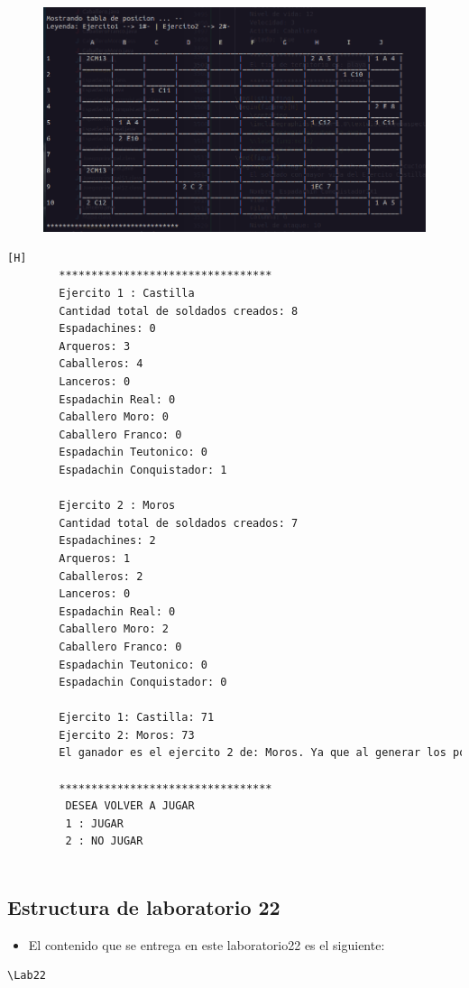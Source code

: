 \documentclass{article}
\begin{document}
	\begin{figure}[H]
		\centering
		\includegraphics[width=1.0\textwidth,keepaspectratio]{img/Commit11-3.png}
	\end{figure}
	\begin{lstlisting}[language=bash,caption={Ejecucion:}][H]
		*********************************
		Ejercito 1 : Castilla
		Cantidad total de soldados creados: 8
		Espadachines: 0
		Arqueros: 3
		Caballeros: 4
		Lanceros: 0
		Espadachin Real: 0
		Caballero Moro: 0
		Caballero Franco: 0
		Espadachin Teutonico: 0
		Espadachin Conquistador: 1
		
		Ejercito 2 : Moros
		Cantidad total de soldados creados: 7
		Espadachines: 2
		Arqueros: 1
		Caballeros: 2
		Lanceros: 0
		Espadachin Real: 0
		Caballero Moro: 2
		Caballero Franco: 0
		Espadachin Teutonico: 0
		Espadachin Conquistador: 0
		
		Ejercito 1: Castilla: 71
		Ejercito 2: Moros: 73
		El ganador es el ejercito 2 de: Moros. Ya que al generar los porcentajes de probabilidad de victoria basada en los niveles de vida de sus soldados y aplicando un experimento aleatorio salio vencedor. (Aleatorio generado : 50.69)
		
		*********************************
		 DESEA VOLVER A JUGAR
		 1 : JUGAR
		 2 : NO JUGAR
		
	\end{lstlisting}
	\subsection{Estructura de laboratorio 22}
	\begin{itemize}	
		\item El contenido que se entrega en este laboratorio22 es el siguiente:
	\end{itemize}
	\begin{lstlisting}[style=ascii-tree]
	\Lab22
	\end{lstlisting}    
\end{document}
